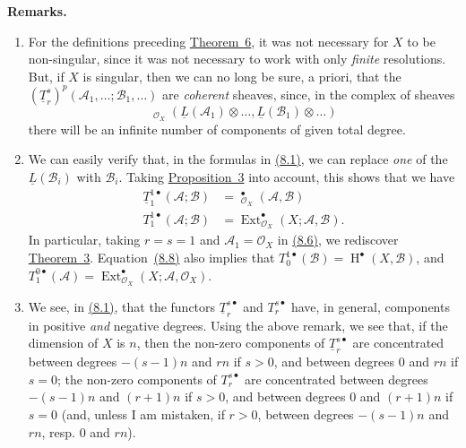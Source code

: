 \documentclass{article}
\newenvironment{rmenv}[1]
  {\phantomsection\par\medskip\noindent\textbf{#1.}\rmfamily}
  {\medskip}
\newcommand{\scr}[1]{{\mathscr{#1}}}
\DeclareMathOperator{\Ext}{Ext}
\DeclareMathOperator{\shExt}{\underline{Ext}}
\DeclareMathOperator{\shHom}{\underline{Hom}}
\DeclareMathOperator{\HH}{H}
\newcommand{\oldpage}[1]{\marginpar{\footnotesize$\Big\vert$ \textit{p.~#1}}}
\begin{document}
\oldpage{149-24}
\begin{rmenv}{Remarks}
  \begin{enumerate}
    \item For the definitions preceding \hyperref[theorem6]{Theorem~6}, it was not necessary for $X$ to be non-singular, since it was not necessary to work with only \emph{finite} resolutions.
      But, if $X$ is singular, then we can no long be sure, a priori, that the $(\underline{T}_r^s)^p(\scr{A}_1,\ldots;\scr{B}_1,\ldots)$ are \emph{coherent} sheaves, since, in the complex of sheaves
      \[
        \shHom_{\scr{O}_X}(\underline{L}(\scr{A}_1)\otimes\ldots,\underline{L}(\scr{B}_1)\otimes\ldots)
      \]
      there will be an infinite number of components of given total degree.
    \item We can easily verify that, in the formulas in \hyperref[8.1]{(8.1)}, we can replace \emph{one} of the $\underline{L}(\scr{B}_i)$ with $\scr{B}_i$.
      Taking \hyperref[proposition3]{Proposition~3} into account, this shows that we have
      \[
      \label{8.8}
        \begin{aligned}
          \underline{T}_1^{1\bullet}(\scr{A};\scr{B})
          &= \shExt_{\scr{O}_X}^\bullet(\scr{A},\scr{B})
        \\T_1^{1\bullet}(\scr{A};\scr{B})
          &= \Ext_{\scr{O}_X}^\bullet(X;\scr{A},\scr{B}).
        \end{aligned}
      \tag{8.8}
      \]
      In particular, taking $r=s=1$ and $\scr{A}_1=\scr{O}_X$ in \hyperref[8.6]{(8.6)}, we rediscover \hyperref[theorem3]{Theorem~3}.
      Equation~\hyperref[8.8]{(8.8)} also implies that $T_0^{1\bullet}(\scr{B})=\HH^\bullet(X,\scr{B})$, and $T_1^{0\bullet}(\scr{A})=\Ext_{\scr{O}_X}^\bullet(X;\scr{A},\scr{O}_X)$.
    \item We see, in \hyperref[8.1]{(8.1)}, that the functors $\underline{T}_r^{s\bullet}$ and $T_r^{s\bullet}$ have, in general, components in positive \emph{and} negative degrees.
      Using the above remark, we see that, if the dimension of $X$ is $n$, then the non-zero components of $\underline{T}_r^{s\bullet}$ are concentrated between degrees $-(s-1)n$ and $rn$ if $s>0$, and between degrees $0$ and $rn$ if $s=0$; the non-zero components of $T_r^{s\bullet}$ are concentrated between degrees $-(s-1)n$ and $(r+1)n$ if $s>0$, and between degrees $0$ and $(r+1)n$ if $s=0$ (and, unless I am mistaken, if $r>0$, between degrees $-(s-1)n$ and $rn$, resp. $0$ and $rn$).
  \end{enumerate}
\end{rmenv}
\end{document}
